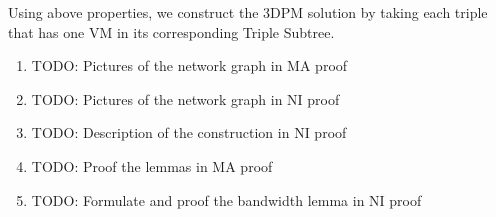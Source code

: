 Using above properties, we construct the 3DPM solution by taking each
triple that has one VM in its corresponding Triple Subtree.

\begin{enumerate}
\item TODO: Pictures of the network graph in MA proof
\item TODO: Pictures of the network graph in NI proof
\item TODO: Description of the construction in NI proof
\item TODO: Proof the lemmas in MA proof
\item TODO: Formulate and proof the bandwidth lemma in NI proof
\end{enumerate}